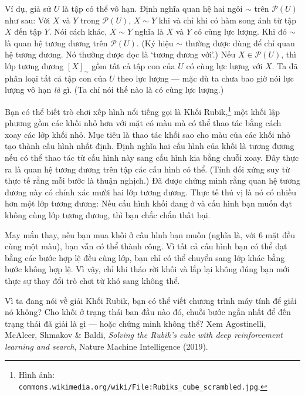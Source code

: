Ví dụ, giả sử $U$ là tập có thể vô hạn. Định nghĩa quan hệ hai ngôi $\sim$ trên $\mathcal{P}(U)$ như sau: Với $X$ và $Y$ trong $\mathcal{P}(U)$, $X \sim Y$ khi và chỉ khi có hàm song ánh từ tập $X$ đến tập $Y$. Nói cách khác, $X \sim Y$ nghĩa là $X$ và $Y$ có cùng lực lượng. Khi đó $\sim$ là quan hệ tương đương trên $\mathcal{P}(U)$. (Ký hiệu $\sim$ thường được dùng để chỉ quan hệ tương đương. Nó thường được đọc là `tương đương với'.) Nếu $X \in \mathcal{P}(U)$, thì lớp tương đương $[X]_{\sim}$ gồm tất cả tập con của $U$ có cùng lực lượng với $X$. Ta đã phân loại tất cả tập con của $U$ theo lực lượng --- mặc dù ta chưa bao giờ nói lực lượng vô hạn \emph{là} gì. (Ta chỉ nói thế nào là có cùng lực lượng.)

Bạn có thể biết trò chơi xếp hình nổi tiếng gọi là Khối Rubik,\footnote{Hình ảnh: \texttt{commons.wikimedia.org/wiki/File:Rubiks\_cube\_scrambled.jpg}.} một khối lập phương gồm các khối nhỏ hơn với mặt có màu mà có thể thao tác bằng cách xoay các lớp khối nhỏ. Mục tiêu là thao tác khối sao cho màu của các khối nhỏ tạo thành cấu hình nhất định. Định nghĩa hai cấu hình của khối là tương đương nếu có thể thao tác từ cấu hình này sang cấu hình kia bằng chuỗi xoay. Đây thực ra là quan hệ tương đương trên tập các cấu hình có thể. (Tính đối xứng suy từ thực tế rằng mỗi bước là thuận nghịch.) Đã được chứng minh rằng quan hệ tương đương này có chính xác mười hai lớp tương đương. Thực tế thú vị là nó có nhiều hơn một lớp tương đương: Nếu cấu hình khối đang ở và cấu hình bạn muốn đạt không cùng lớp tương đương, thì bạn chắc chắn thất bại.

\begin{example}
May mắn thay, nếu bạn mua khối ở cấu hình bạn muốn (nghĩa là, với 6 mặt đều cùng một màu), bạn vẫn có thể thành công. Vì tất cả cấu hình bạn có thể đạt bằng các bước hợp lệ đều cùng lớp, bạn chỉ có thể chuyển sang lớp khác bằng bước không hợp lệ. Vì vậy, chỉ khi tháo rời khối và lắp lại không đúng bạn mới thực sự thay đổi trò chơi từ khó sang không thể.

Vì ta đang nói về giải Khối Rubik, bạn có thể viết chương trình máy tính để giải nó không? Cho khối ở trạng thái ban đầu nào đó, chuỗi bước ngắn nhất để đến trạng thái đã giải là gì --- hoặc chứng minh không thể? Xem Agostinelli, McAleer, Shmakov \& Baldi, \emph{Solving the Rubik's cube with deep reinforcement learning and search}, Nature Machine Intelligence (2019).
\end{example}

